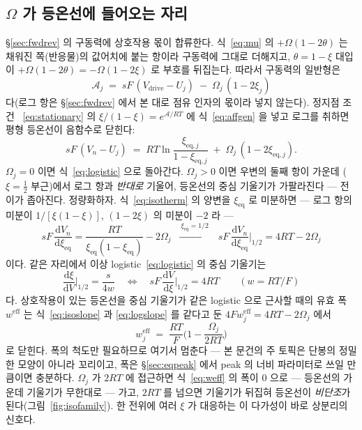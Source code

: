 \documentclass[11pt,a4paper]{article}
\newcommand{\dd}{\mathrm{d}}
\newcommand{\eff}{\mathrm{eff}}
\newcommand{\eq}{\mathrm{eq}}
\newcommand{\drive}{\mathrm{drive}}
\begin{document}
\subsection{$\Omega$ 가 등온선에 들어오는 자리}
\S\ref{sec:fwdrev} 의 구동력에 상호작용 몫이 합류한다. 식~\eqref{eq:mu} 의 $+\Omega(1-2\theta)$ 는
채워진 쪽(반응물)의 값어치에 붙는 항이라 구동력에 그대로 더해지고, $\theta=1-\xi$ 대입이
$+\Omega(1-2\theta)=-\Omega(1-2\xi)$ 로 부호를 뒤집는다. 따라서 구동력의 일반형은
\begin{equation}
\mathcal A_j\;=\;sF\,(V_\drive-U_j)\;-\;\Omega_j\,(1-2\xi_j)
\label{eq:affgen}
\end{equation}
다(로그 항은 \S\ref{sec:fwdrev} 에서 본 대로 점유 인자의 몫이라 넣지 않는다). 정지점 조건
~\eqref{eq:stationary} 의 $\xi/(1-\xi)=e^{\mathcal A/RT}$ 에 식~\eqref{eq:affgen} 을 넣고 로그를
취하면 평형 등온선이 음함수로 닫힌다:
\begin{equation}
sF\,(V_n-U_j)\;=\;RT\ln\frac{\xi_{\eq,j}}{1-\xi_{\eq,j}}\;+\;\Omega_j\,(1-2\xi_{\eq,j}).
\label{eq:isotherm}
\end{equation}
$\Omega_j=0$ 이면 식~\eqref{eq:logistic} 으로 돌아간다. $\Omega_j>0$ 이면 우변의 둘째 항이 가운데
($\xi=\tfrac12$ 부근)에서 로그 항과 \emph{반대로} 기울어, 등온선의 중심 기울기가 가팔라진다 — 전이가
좁아진다. 정량화하자. 식~\eqref{eq:isotherm} 의 양변을 $\xi_{\eq}$ 로 미분하면 — 로그 항의 미분이
$1/[\xi(1-\xi)]$, $(1-2\xi)$ 의 미분이 $-2$ 라 —
\begin{equation}
sF\,\frac{\dd V_n}{\dd\xi_{\eq}}
=\frac{RT}{\xi_{\eq}(1-\xi_{\eq})}-2\Omega_j
\;\;\xrightarrow{\ \xi_{\eq}=1/2\ }\;\;
sF\,\frac{\dd V_n}{\dd\xi_{\eq}}\Big|_{1/2}=4RT-2\Omega_j
\label{eq:isoslope}
\end{equation}
이다. 같은 자리에서 이상 logistic~\eqref{eq:logistic} 의 중심 기울기는
\begin{equation}
\frac{\dd\xi}{\dd V}\Big|_{1/2}=\frac{s}{4w}
\quad\Longleftrightarrow\quad
sF\,\frac{\dd V}{\dd\xi}\Big|_{1/2}=4RT
\qquad(w=RT/F)
\label{eq:logslope}
\end{equation}
다. 상호작용이 있는 등온선을 중심 기울기가 같은 logistic 으로 근사할 때의 유효 폭 $w^{\eff}$ 는
식~\eqref{eq:isoslope} 과 \eqref{eq:logslope} 를 같다고 둔 $4Fw_j^{\eff}=4RT-2\Omega_j$ 에서
\begin{equation}
w_j^{\eff}\;=\;\frac{RT}{F}\Big(1-\frac{\Omega_j}{2RT}\Big)
\label{eq:weff}
\end{equation}
로 닫힌다. 폭의 척도만 필요하므로 여기서 멈춘다 — 본 문건의 주 토픽은 단봉의 정밀한 모양이 아니라 꼬리이고,
폭은 \S\ref{sec:eqpeak} 에서 peak 의 너비 파라미터로 쓰일 만큼이면 충분하다. $\Omega_j$ 가 $2RT$ 에
접근하면 식~\eqref{eq:weff} 의 폭이 $0$ 으로 — 등온선의 가운데 기울기가 무한대로 — 가고, $2RT$ 를 넘으면
기울기가 뒤집혀 등온선이 \emph{비단조}가 된다(그림~\ref{fig:isofamily}). 한 전위에 여러 $\xi$ 가
대응하는 이 다가성이 바로 상분리의 신호다.
\end{document}

